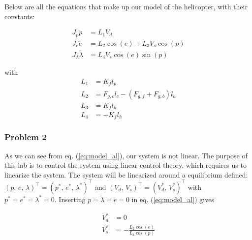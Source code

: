 Below are all the equations that make up our model of the helicopter, with their constants:

\begin{subequations}\label{eq:model_al}
	\begin{align}
		J_p\ddot{p} &= L_{1}V_{d} \label{eq:model_se_al_pitch}\\
		J_e\ddot{e} &= L_{2} \cos(e) + L_3 V_s \cos(p) \label{eq:model_se_al_elev}\\
		J_\lambda \ddot{\lambda} &= L_4 V_s \cos(e) \sin(p) \label{eq:model_se_al_lambda}
	\end{align}
\end{subequations}

with 
\begin{subequations}
    \begin{align}
    L_1 &= K_f l_p \\
    L_2 &= F_{g, c} l_c - (F_{g, f} + F_{g, b}) l_h \\
    L_3 &= K_f l_h \\
    L_4 &= -K_f l_h
    \end{align}
\end{subequations}





\subsubsection{Problem 2}
As we can see from eq. (\ref{eq:model_al}), our system is not linear. The purpose of this lab is to control the system using linear control theory, which requires us to linearize the system. The system will be linearized around a equilibrium defined: $(p,\, e,\, \lambda)^\top = (p^\ast,\, e^\ast,\, \lambda ^\ast)^\top$ and $(V_d,\, V_s)^\top = (V_d^\ast,\, V_s^\ast)^\top$ with $p^\ast = e^\ast = \lambda ^\ast = 0$. Inserting $\ddot{p} = \ddot{\lambda} = \ddot{e} = 0$ in eq. (\ref{eq:model_al}) gives

\begin{subequations} \label{eq:voltage_equi}
    \begin{align}
        V_d^\ast &= 0 \label{eq:voltage_equi_1}\\
        V_s^\ast &= - \frac{L_2 \cos(e)}{L_3 \cos(p)}\label{eq:voltage_equi_2}
    \end{align}
\end{subequations}

